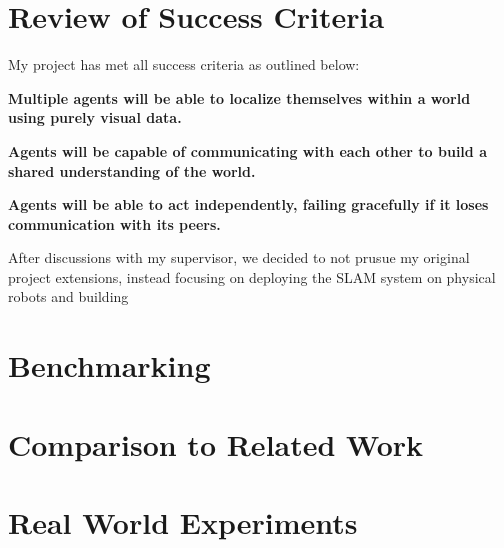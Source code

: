

\label{sec:4}

\section{Review of Success Criteria}
\label{sec:review-of-success-criteria}
My project has met all success criteria as outlined below:

\textbf{Multiple agents will be able to localize themselves within a world using purely visual data.}

\textbf{Agents will be capable of communicating with each other to build a shared understanding of the world.}

\textbf{Agents will be able to act independently, failing gracefully if it loses communication with its peers.}


After discussions with my supervisor, we decided to not prusue my original project extensions, instead focusing on deploying the SLAM system on physical robots and building

\section{Benchmarking}
\label{sec:benchmarking}

\section{Comparison to Related Work}
\label{sec:comparison-to-related-work}



\section{Real World Experiments}
\label{sec:real-world-experiments}

